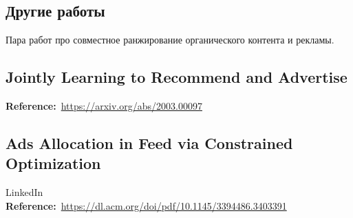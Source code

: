 \begin{bibunit}[plainnat]













\chapter{Другие работы}

Пара работ про совместное ранжирование органического контента и рекламы.

\section*{Jointly Learning to Recommend and Advertise}

\textbf{Reference:}~\url{https://arxiv.org/abs/2003.00097}

\section*{Ads Allocation in Feed via Constrained Optimization}

LinkedIn \\

\textbf{Reference:}~\url{https://dl.acm.org/doi/pdf/10.1145/3394486.3403391}

\end{bibunit}
